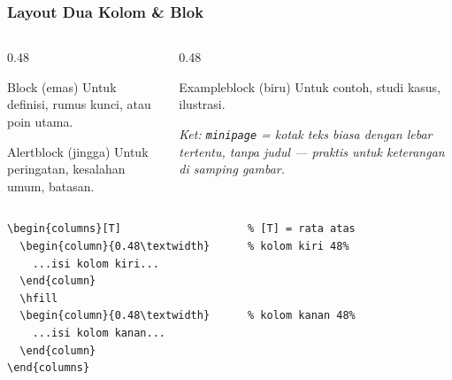 \begin{frame}[fragile]
  \frametitle{Layout Dua Kolom \& Blok}

  \begin{columns}[T]
    \begin{column}{0.48\textwidth}
      \begin{block}{Block (emas)}
        Untuk definisi, rumus kunci, atau poin utama.
      \end{block}

      \begin{alertblock}{Alertblock (jingga)}
        Untuk peringatan, kesalahan umum, batasan.
      \end{alertblock}
    \end{column}
    \hfill
    \begin{column}{0.48\textwidth}
      \begin{exampleblock}{Exampleblock (biru)}
        Untuk contoh, studi kasus, ilustrasi.
      \end{exampleblock}

      \medskip
      {\small\itshape Ket: \texttt{minipage} = kotak teks biasa dengan lebar
       tertentu, tanpa judul — praktis untuk keterangan di samping gambar.}
    \end{column}
  \end{columns}

  \medskip
  \begin{lstlisting}[basicstyle=\ttfamily\tiny]
\begin{columns}[T]                    % [T] = rata atas
  \begin{column}{0.48\textwidth}      % kolom kiri 48%
    ...isi kolom kiri...
  \end{column}
  \hfill
  \begin{column}{0.48\textwidth}      % kolom kanan 48%
    ...isi kolom kanan...
  \end{column}
\end{columns}
  \end{lstlisting}
\end{frame}

